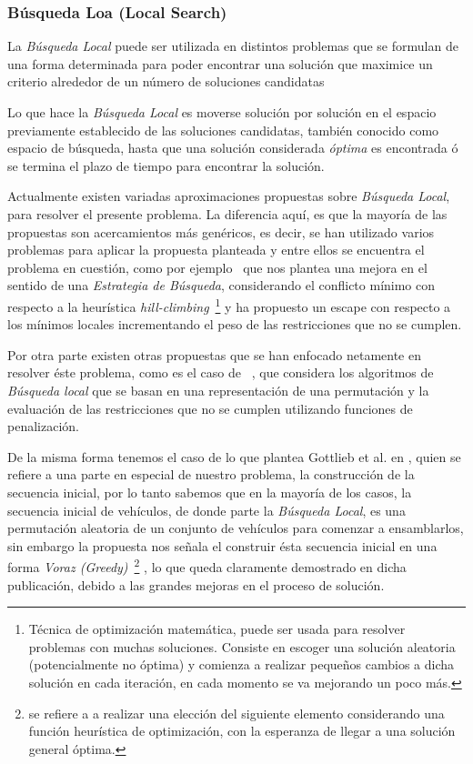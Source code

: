 \subsubsection{Búsqueda Loa (Local Search)}
La \emph{Búsqueda Local} puede ser utilizada en distintos problemas que se formulan
de una forma determinada para poder encontrar una solución que maximice un criterio alrededor de un número
de soluciones candidatas

Lo que hace la \emph{Búsqueda Local} es moverse solución por solución en el espacio previamente establecido
de las soluciones candidatas, también conocido como espacio de búsqueda, hasta que una solución considerada \emph{óptima}
es encontrada ó se termina el plazo de tiempo para encontrar la solución.

Actualmente existen variadas aproximaciones propuestas sobre \emph{Búsqueda Local},
para resolver el presente problema.
La diferencia aquí, es que la mayoría de las propuestas son acercamientos más
genéricos, es decir, se han utilizado varios problemas para aplicar la propuesta
planteada y entre ellos se encuentra el problema en cuestión, como por ejemplo~\cite{DTWZ94}
que nos plantea una mejora en el sentido de una \emph{Estrategia de Búsqueda}, considerando
el conflicto mínimo con respecto a la heurística \emph{hill-climbing}~\footnote{
Técnica de optimización matemática, puede ser usada para resolver problemas con muchas soluciones.
Consiste en escoger una solución aleatoria (potencialmente no óptima) y comienza a
realizar pequeños cambios a dicha solución en cada iteración, en cada momento se va mejorando un poco más.
}
y ha propuesto un escape con respecto a los mínimos locales incrementando el peso de las
restricciones que no se cumplen.

Por otra parte existen otras propuestas que se han enfocado netamente en resolver éste problema,
como es el caso de ~\cite{PG02}, que considera los algoritmos de \emph{Búsqueda local}
que se basan en una representación de una permutación y la evaluación de las restricciones que no se
cumplen utilizando funciones de penalización.

De la misma forma tenemos el caso de lo que plantea Gottlieb et al. en \cite{GPS03}, quien se refiere
a una parte en especial de nuestro problema, la construcción de la secuencia inicial, por lo tanto
sabemos que en la mayoría de los casos, la secuencia inicial de vehículos, de donde parte la
\emph{Búsqueda Local}, es una permutación aleatoria de un conjunto de vehículos para comenzar
a ensamblarlos, sin embargo la propuesta nos señala el construir ésta secuencia inicial en una forma
\emph{Voraz (Greedy)}~\footnote{
se refiere a a realizar una elección del siguiente elemento considerando una función heurística de optimización,
con la esperanza de llegar a una solución general óptima.
}
, lo que queda claramente demostrado en dicha publicación,
debido a las grandes mejoras en el proceso de solución.

